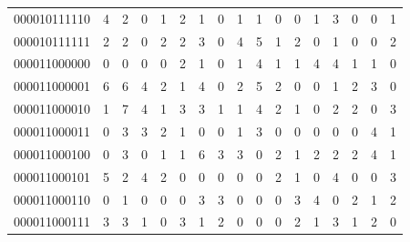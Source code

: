 \documentclass[10pt,a4paper]{article}
\begin{document}
\begin{longtable}{ |c|c|c|c|c|c|c|c|c|c|c|c|c|c|c|c|c| }
    000010111110              & 4                            & 2                                & 0                            & 1                              & 2   & 1   & 0   & 1   & 1   & 0   & 0   & 1   & 3   & 0   & 0   & 1   \\
    000010111111              & 2                            & 2                                & 0                            & 2                              & 2   & 3   & 0   & 4   & 5   & 1   & 2   & 0   & 1   & 0   & 0   & 2   \\
    000011000000              & 0                            & 0                                & 0                            & 0                              & 2   & 1   & 0   & 1   & 4   & 1   & 1   & 4   & 4   & 1   & 1   & 0   \\
    000011000001              & 6                            & 6                                & 4                            & 2                              & 1   & 4   & 0   & 2   & 5   & 2   & 0   & 0   & 1   & 2   & 3   & 0   \\
    000011000010              & 1                            & 7                                & 4                            & 1                              & 3   & 3   & 1   & 1   & 4   & 2   & 1   & 0   & 2   & 2   & 0   & 3   \\
    000011000011              & 0                            & 3                                & 3                            & 2                              & 1   & 0   & 0   & 1   & 3   & 0   & 0   & 0   & 0   & 0   & 4   & 1   \\
    000011000100              & 0                            & 3                                & 0                            & 1                              & 1   & 6   & 3   & 3   & 0   & 2   & 1   & 2   & 2   & 2   & 4   & 1   \\
    000011000101              & 5                            & 2                                & 4                            & 2                              & 0   & 0   & 0   & 0   & 0   & 2   & 1   & 0   & 4   & 0   & 0   & 3   \\
    000011000110              & 0                            & 1                                & 0                            & 0                              & 0   & 3   & 3   & 0   & 0   & 0   & 3   & 4   & 0   & 2   & 1   & 2   \\
    000011000111              & 3                            & 3                                & 1                            & 0                              & 3   & 1   & 2   & 0   & 0   & 0   & 2   & 1   & 3   & 1   & 2   & 0   \\

\end{longtable}
\end{document}
